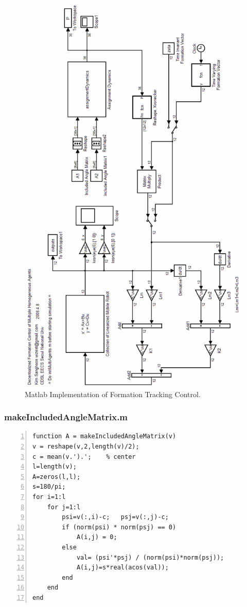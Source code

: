 \documentclass[11pt, a4paper, oneside, openany, reqno]{book}
\theoremstyle{definition}
\theoremstyle{remark}
\numberwithin{equation}{chapter} %
\begin{document}
\begin{figure}[htp]
	\centering
	\includegraphics[height=0.95\textheight]{matlabMultiAgents.png}
	\caption{Matlab Implementation of Formation Tracking Control.}
\end{figure}

\subsubsection{makeIncludedAngleMatrix.m}
\begin{footnotesize}
\begin{Verbatim}[fontfamily=cmtt,baselinestretch=0,numbers=left]
function A = makeIncludedAngleMatrix(v)
v = reshape(v,2,length(v)/2);
c = mean(v.').';    % center
l=length(v);
A=zeros(l,l);
s=180/pi;
for i=1:l
    for j=1:l
        psi=v(:,i)-c;   psj=v(:,j)-c;
        if (norm(psi) * norm(psj) == 0)
            A(i,j) = 0;
        else
            val= (psi'*psj) / (norm(psi)*norm(psj));
            A(i,j)=s*real(acos(val));
        end
    end
end
\end{Verbatim}
\end{footnotesize}
\end{document}

